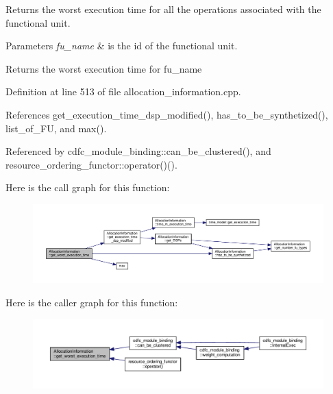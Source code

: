 Returns the worst execution time for all the operations associated with the functional unit. 


\begin{DoxyParams}{Parameters}
{\em fu\+\_\+name} & is the id of the functional unit. \\
\hline
\end{DoxyParams}
\begin{DoxyReturn}{Returns}
the worst execution time for fu\+\_\+name 
\end{DoxyReturn}


Definition at line 513 of file allocation\+\_\+information.\+cpp.



References get\+\_\+execution\+\_\+time\+\_\+dsp\+\_\+modified(), has\+\_\+to\+\_\+be\+\_\+synthetized(), list\+\_\+of\+\_\+\+FU, and max().



Referenced by cdfc\+\_\+module\+\_\+binding\+::can\+\_\+be\+\_\+clustered(), and resource\+\_\+ordering\+\_\+functor\+::operator()().

Here is the call graph for this function\+:
\nopagebreak
\begin{figure}[H]
\begin{center}
\leavevmode
\includegraphics[width=350pt]{d7/d79/classAllocationInformation_ac059b480028b8c93e67313eb73b52c88_cgraph}
\end{center}
\end{figure}
Here is the caller graph for this function\+:
\nopagebreak
\begin{figure}[H]
\begin{center}
\leavevmode
\includegraphics[width=350pt]{d7/d79/classAllocationInformation_ac059b480028b8c93e67313eb73b52c88_icgraph}
\end{center}
\end{figure}
\mbox{\label{classAllocationInformation_a49fdcc7141cc14a63df2ae3f35dccc7a}} 
